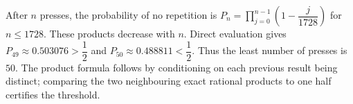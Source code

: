 After $n$ presses, the probability of no repetition is $P_n=\prod_{j=0}^{n-1}(1-\dfrac{j}{1728})$ for $n\le1728$. These products decrease with $n$. Direct evaluation gives $P_{49}\approx0.503076>\dfrac{1}{2}$ and $P_{50}\approx0.488811<\dfrac{1}{2}$. Thus the least number of presses is $\boxed{50}$. The product formula follows by conditioning on each previous result being distinct; comparing the two neighbouring exact rational products to one half certifies the threshold.
